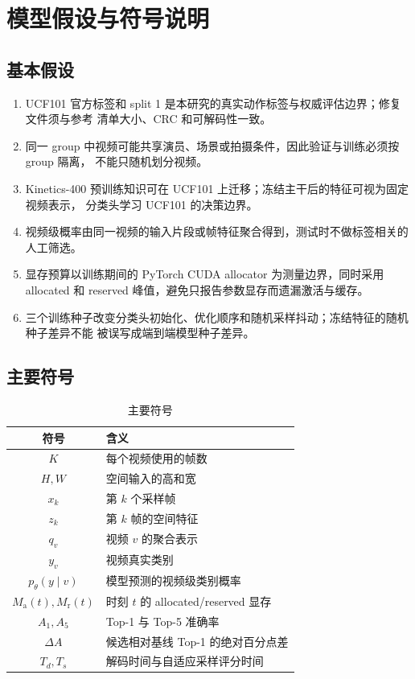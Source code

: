 \section{模型假设与符号说明}

\subsection{基本假设}

\begin{enumerate}
  \item UCF101 官方标签和 split 1 是本研究的真实动作标签与权威评估边界；修复文件须与参考
        清单大小、CRC 和可解码性一致。
  \item 同一 group 中视频可能共享演员、场景或拍摄条件，因此验证与训练必须按 group 隔离，
        不能只随机划分视频。
  \item Kinetics-400 预训练知识可在 UCF101 上迁移；冻结主干后的特征可视为固定视频表示，
        分类头学习 UCF101 的决策边界。
  \item 视频级概率由同一视频的输入片段或帧特征聚合得到，测试时不做标签相关的人工筛选。
  \item 显存预算以训练期间的 PyTorch CUDA allocator 为测量边界，同时采用 allocated 和
        reserved 峰值，避免只报告参数显存而遗漏激活与缓存。
  \item 三个训练种子改变分类头初始化、优化顺序和随机采样抖动；冻结特征的随机种子差异不能
        被误写成端到端模型种子差异。
\end{enumerate}

\subsection{主要符号}

\begin{table}[H]
  \centering
  \caption{主要符号}
  \label{tab:symbols}
  \begin{tabular}{cl}
    \toprule
    符号 & 含义 \\
    \midrule
    $K$ & 每个视频使用的帧数 \\
    $H,W$ & 空间输入的高和宽 \\
    $x_k$ & 第 $k$ 个采样帧 \\
    $z_k$ & 第 $k$ 帧的空间特征 \\
    $q_v$ & 视频 $v$ 的聚合表示 \\
    $y_v$ & 视频真实类别 \\
    $p_\theta(y\mid v)$ & 模型预测的视频级类别概率 \\
    $M_{\mathrm{a}}(t),M_{\mathrm{r}}(t)$ & 时刻 $t$ 的 allocated/reserved 显存 \\
    $A_1,A_5$ & Top-1 与 Top-5 准确率 \\
    $\Delta A$ & 候选相对基线 Top-1 的绝对百分点差 \\
    $T_d,T_s$ & 解码时间与自适应采样评分时间 \\
    \bottomrule
  \end{tabular}
\end{table}
